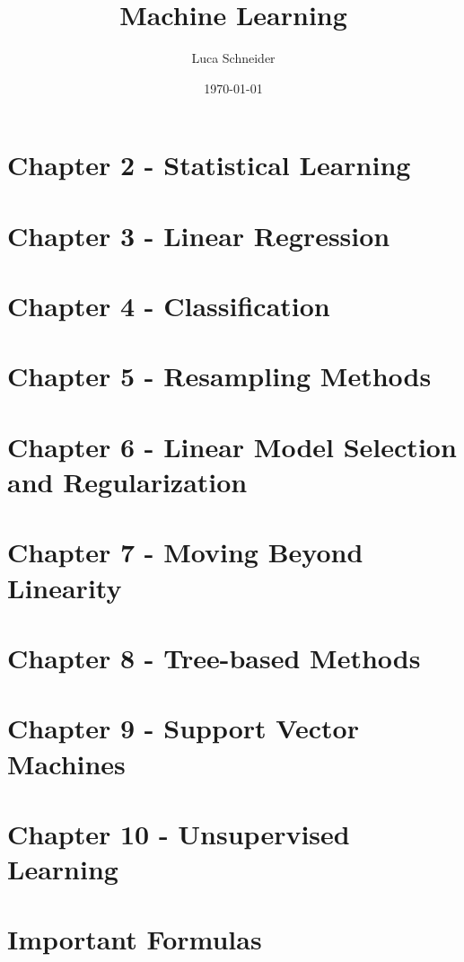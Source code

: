\documentclass{article}
\title{Machine Learning}
\author{Luca Schneider}
\date{\today}
\begin{document}
	\maketitle

	\newpage

	\tableofcontents

	\newpage


	\section{Chapter 2 - Statistical Learning}

	

	\section{Chapter 3 - Linear Regression}

	

	\section{Chapter 4 - Classification}

	

	\section{Chapter 5 - Resampling Methods}

	

	\section{Chapter 6 - Linear Model Selection and Regularization}

	

	\section{Chapter 7 - Moving Beyond Linearity}

	

	\section{Chapter 8 - Tree-based Methods}

	

	\section{Chapter 9 - Support Vector Machines}

	

	\section{Chapter 10 - Unsupervised Learning}

	

	\section{Important Formulas}

	
\end{document}
